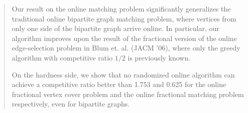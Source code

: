 \documentclass{article}
\newcommand{\yajun}[1]{{\color{red}{#1}}}
\begin{document}
\begin{abstract}
Our result on the online matching problem significantly generalizes the traditional online bipartite graph matching problem, where vertices from only one side of the bipartite graph arrive online. In particular, our algorithm improves upon the result of the fractional version of the online edge-selection problem in Blum et. al. (JACM '06), where only the greedy algorithm with competitive ratio $1/2$ is previously known. 








On the hardness side, we show that no randomized online algorithm can achieve a competitive ratio better than 1.753 and 0.625 for the online fractional vertex cover problem and the online fractional matching problem respectively, even for bipartite graphs.
\end{abstract}
\end{document}

